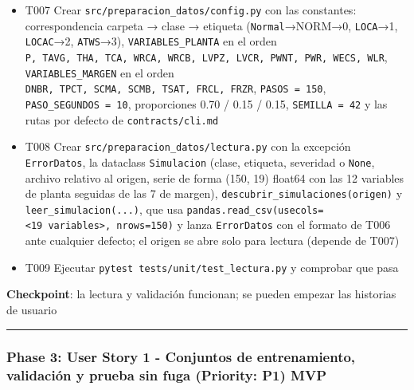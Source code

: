 \documentclass[12pt,a4paper]{article}
\providecommand{\tightlist}{\setlength{\itemsep}{0pt}\setlength{\parskip}{0pt}}
\newenvironment{documentogenerado}[2]{%
  \def\doccomando{#1}\def\docruta{#2}%
  \par\begingroup\small\setstretch{1.15}\sloppy%
}{\endgroup\par\medskip}
\begin{document}
\begin{documentogenerado}{/speckit-tasks (fase 7: /speckit-converge)}{specs\slash 001-preparacion-datos\slash tasks.md}
\begin{itemize}
\tightlist
\item[$\boxtimes$]
  T007 Crear \texttt{src/\allowbreak{}preparacion\_\allowbreak{}datos/\allowbreak{}config.\allowbreak{}py} con las constantes: correspondencia carpeta → clase → etiqueta (\texttt{Normal}→NORM→0, \texttt{LOCA}→1, \texttt{LOCAC}→2, \texttt{ATWS}→3), \texttt{VARIABLES\_\allowbreak{}PLANTA} en el orden \texttt{P,\ TAVG,\ THA,\ TCA,\ WRCA,\ WRCB,\ LVPZ,\ LVCR,\ PWNT,\ PWR,\ WECS,\ WLR}, \texttt{VARIABLES\_\allowbreak{}MARGEN} en el orden \texttt{DNBR,\ TPCT,\ SCMA,\ SCMB,\ TSAT,\ FRCL,\ FRZR}, \texttt{PASOS\ =\allowbreak{}\ 150}, \texttt{PASO\_\allowbreak{}SEGUNDOS\ =\allowbreak{}\ 10}, proporciones 0.70 / 0.15 / 0.15, \texttt{SEMILLA\ =\allowbreak{}\ 42} y las rutas por defecto de \texttt{contracts/\allowbreak{}cli.\allowbreak{}md}
\item[$\boxtimes$]
  T008 Crear \texttt{src/\allowbreak{}preparacion\_\allowbreak{}datos/\allowbreak{}lectura.\allowbreak{}py} con la excepción \texttt{ErrorDatos}, la dataclass \texttt{Simulacion} (clase, etiqueta, severidad o \texttt{None}, archivo relativo al origen, serie de forma (150, 19) float64 con las 12 variables de planta seguidas de las 7 de margen), \texttt{descubrir\_\allowbreak{}simulaciones(origen)} y \texttt{leer\_\allowbreak{}simulacion(.\allowbreak{}.\allowbreak{}.\allowbreak{})}, que usa \texttt{pandas.\allowbreak{}read\_\allowbreak{}csv(usecols=\allowbreak{}\textless{}19\ variables\textgreater{},\ nrows=\allowbreak{}150)} y lanza \texttt{ErrorDatos} con el formato de T006 ante cualquier defecto; el origen se abre solo para lectura (depende de T007)
\item[$\boxtimes$]
  T009 Ejecutar \texttt{pytest\ tests/\allowbreak{}unit/\allowbreak{}test\_\allowbreak{}lectura.\allowbreak{}py} y comprobar que pasa
\end{itemize}

\textbf{Checkpoint}: la lectura y validación funcionan; se pueden empezar las historias de usuario

\begin{center}\rule{0.5\linewidth}{0.5pt}\end{center}

\subsubsection{Phase 3: User Story 1 - Conjuntos de entrenamiento, validación y prueba sin fuga (Priority: P1) MVP}


\end{documentogenerado}
\end{document}
